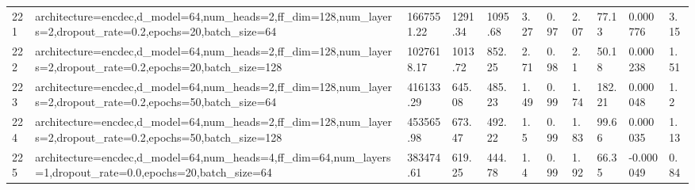 \begin{longtable}{C{0.8cm} L{2cm} C{1.15cm} C{1.15cm} C{1.15cm} C{1.15cm} C{0.85cm} C{1.25cm} C{1.2cm} C{1.5cm} C{1.0cm}}
221 & architecture=encdec,\newline d\_model=64,\newline num\_heads=2,\newline ff\_dim=128,\newline num\_layers=2,\newline dropout\_rate=0.2,\newline epochs=20,\newline batch\_size=64 & 1667551.22 & 1291.34 & 1095.68 & 3.27 & 0.97 & 2.07 & 77.13 & 0.000776 & 3.15 \\
222 & architecture=encdec,\newline d\_model=64,\newline num\_heads=2,\newline ff\_dim=128,\newline num\_layers=2,\newline dropout\_rate=0.2,\newline epochs=20,\newline batch\_size=128 & 1027618.17 & 1013.72 & 852.25 & 2.71 & 0.98 & 2.1 & 50.18 & 0.000238 & 1.51 \\
223 & architecture=encdec,\newline d\_model=64,\newline num\_heads=2,\newline ff\_dim=128,\newline num\_layers=2,\newline dropout\_rate=0.2,\newline epochs=50,\newline batch\_size=64 & 416133.29 & 645.08 & 485.23 & 1.49 & 0.99 & 1.74 & 182.21 & 0.000048 & 1.2 \\
224 & architecture=encdec,\newline d\_model=64,\newline num\_heads=2,\newline ff\_dim=128,\newline num\_layers=2,\newline dropout\_rate=0.2,\newline epochs=50,\newline batch\_size=128 & 453565.98 & 673.47 & 492.22 & 1.5 & 0.99 & 1.83 & 99.66 & 0.000035 & 1.13 \\
225 & architecture=encdec,\newline d\_model=64,\newline num\_heads=4,\newline ff\_dim=64,\newline num\_layers=1,\newline dropout\_rate=0.0,\newline epochs=20,\newline batch\_size=64 & 383474.61 & 619.25 & 444.78 & 1.4 & 0.99 & 1.92 & 66.35 & -0.000049 & 0.84 \\

\end{longtable}

